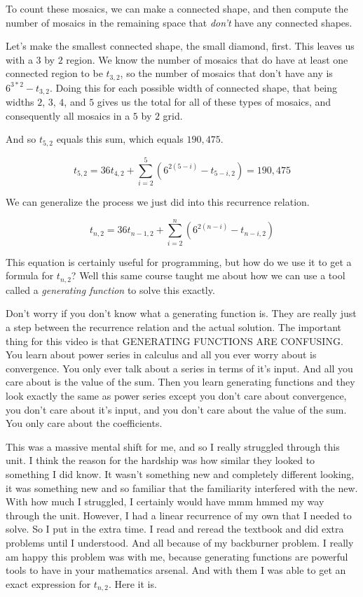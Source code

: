 \documentclass[12pt]{article}
\theoremstyle{plain}
\theoremstyle{definition}
\theoremstyle{remark}
\theoremstyle{definition}
\begin{document}
To count these mosaics, we can make a connected shape, and then compute the number of mosaics in the remaining space that \textit{don't} have any connected shapes. 

Let's make the smallest connected shape, the small diamond, first. This leaves us with a $3$ by $2$ region. We know the number of mosaics that do have at least one connected region to be $t_{3,2}$, so the number of mosaics that don't have any is $6^{3*2} - t_{3,2}$. Doing this for each possible width of connected shape, that being widths $2$, $3$, $4$, and $5$ gives us the total for all of these types of mosaics, and consequently all mosaics in a $5$ by $2$ grid. 

And so $t_{5,2}$ equals this sum, which equals $190,475$.

$$t_{5,2} = 36t_{4,2} + \sum_{i=2}^5(6^{2(5-i)} - t_{5-i,2}) = 190,475$$

We can generalize the process we just did into this recurrence relation.

$$t_{n,2} = 36t_{n-1,2} + \sum_{i=2}^{n}(6^{2(n-i)}-t_{n-i,2})$$

This equation is certainly useful for programming, but how do we use it to get a formula for $t_{n,2}$? Well this same course taught me about how we can use a tool called a \textit{generating function} to solve this exactly.

Don't worry if you don't know what a generating function is. They are really just a step between the recurrence relation and the actual solution. The important thing for this video is that GENERATING FUNCTIONS ARE CONFUSING. You learn about power series in calculus and all you ever worry about is convergence. You only ever talk about a series in terms of it's input. And all you care about is the value of the sum. Then you learn generating functions and they look exactly the same as power series except you don't care about convergence, you don't care about it's input, and you don't care about the value of the sum. You only care about the coefficients. 

This was a massive mental shift for me, and so I really struggled through this unit. I think the reason for the hardship was how similar they looked to something I did know. It wasn't something new and completely different looking, it was something new and so familiar that the familiarity interfered with the new. With how much I struggled, I certainly would have mmm hmmed my way through the unit. However, I had a linear recurrence of my own that I needed to solve. So I put in the extra time. I read and reread the textbook and did extra problems until I understood. And all because of my backburner problem. I really am happy this problem was with me, because generating functions are powerful tools to have in your mathematics arsenal. 
And with them I was able to get an exact expression for $t_{n,2}$. Here it is.
\end{document}
